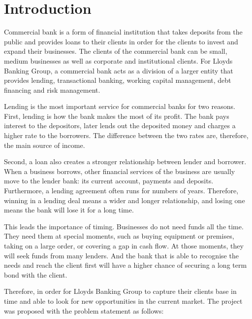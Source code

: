 \documentclass[ %
                    author={Natchalin Iwsakul \\ Inkaphol Siriwongwattana \\ Tanaphan Kummaraphat \\ Patorn Srisupap},
                supervisor={Fernando Moreno-Pino},
                    degree={MSc},
                     title={Propensity Modelling for SME Commercial Lending Using Open Public Data},
                  subtitle={Companies House filings and GDELT media coverage as predictors of first-time borrowing},
                      type={},
                      year={2026}]{dissertation}
\begin{document}
\mainmatter


\chapter{Introduction}
\label{chap:introduction}

\vspace{1cm} 

\noindent

Commercial bank is a form of financial institution that takes deposits from the public and provides loans to their clients in order for the clients to invest and expand their businesses. The clients of the commercial bank can be small, medium businesses as well as corporate and institutional clients. For Lloyds Banking Group, a commercial bank acts as a division of a larger entity that provides lending, transactional banking, working capital management, debt financing and risk management.

Lending is the most important service for commercial banks for two reasons. First, lending is how the bank makes the most of its profit. The bank pays interest to the depositors, later lends out the deposited money and charges a higher rate to the borrowers. The difference between the two rates are, therefore, the main source of income.

Second, a loan also creates a stronger relationship between lender and borrower. When a business borrows, other financial services of the business are usually move to the lender bank: its current account, payments and deposits. Furthermore, a lending agreement often runs for numbers of years. Therefore, winning in a lending deal means a wider and longer relationship, and losing one means the bank will lose it for a long time.

This leads the importance of timing. Businesses do not need funds all the time. They need them at special moments, such as buying equipment or premises, taking on a large order, or covering a gap in cash flow. At those moments,  they will seek funds from many lenders. And the bank that is able to recognise the needs and reach the client first will have a higher chance of securing a long term bond with the client.

Therefore, in order for Lloyds Banking Group to capture their clients base in time and able to look for new opportunities in the current market. The project was proposed with the problem statement as follows:
\end{document}
